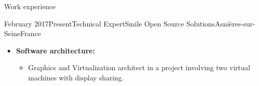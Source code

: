 \documentclass[a4paper, 10pt]{article}
\begin{document}
\begin{section} {Work experience}
    \begin{experience}{February 2017}{Present}{Technical Expert}{Smile Open Source Solutions}{Asni\`{e}res-sur-Seine}{France}
    \begin{subexperience}
    \begin{itemize}[parsep=0cm,itemsep=0cm,topsep=0cm]
		\item \textbf {Software architecture:}
		\begin{itemize}[parsep=0cm,itemsep=0cm,topsep=0cm]
		\item Graphics and Virtualization architect in a project involving two virtual machines with display sharing.
		\end{itemize}
	\end{itemize}
	\end{subexperience}
	\end{experience}


\end{section}
\end{document}
